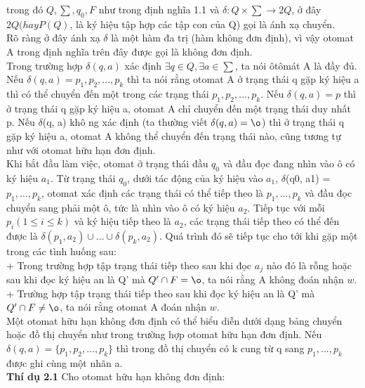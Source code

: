 \begin{flushleft}
trong đó $Q, \sum, q_0, F$ như trong định nghĩa 1.1 và $\delta: Q \times \sum \to 2Q$, ở đây $2Q (hay P(Q)$, là ký hiệu tập hợp các tập con của Q) gọi là ánh xạ chuyển.\\
Rõ ràng ở đây ánh xạ $\delta$ là một hàm đa trị (hàm không đơn định), vì vậy otomat A trong định nghĩa trên đây được gọi là không đơn định.\\
Trong trường hợp $\delta(q, a)$ xác định $\exists q \in Q, \exists a \in \sum$, ta nói ôtômát A là đầy đủ.\\
\hspace{10mm}Nếu $\delta(q, a) = {p_1, p_2,..., p_k}$ thì ta nói rằng otomat A ở trạng thái q gặp ký hiệu a thì có thể chuyển đến một trong các trạng thái $p_1, p_2,..., p_k$. Nếu $\delta(q, a) = {p}$ thì ở trạng thái q gặp ký hiệu a, otomat A chỉ chuyển đến một trạng thái duy nhất p. Nếu $\delta$(q, a) khô ng xác định (ta thường viết $\delta(q, a) = \o $) thì ở trạng thái q gặp ký hiệu a, otomat A không thể chuyển đến trạng thái nào, cũng tương tự như với otomat hữu hạn đơn định.\\
\hspace{10mm}Khi bắt đầu làm việc, otomat ở trạng thái đầu $q_0$ và đầu đọc đang nhìn vào ô có ký hiệu $a_1$. Từ trạng thái $q_0$, dưới tác động của ký hiệu vào $a_1$, $\delta$(q0, a1) = {$p_1,..., p_k$}, otomat xác định các trạng thái có thể tiếp theo là $p_1,..., p_k$ và đầu đọc chuyển sang phải một ô, tức là nhìn vào ô có ký hiệu $a_2$. Tiếp tục với mỗi $p_i (1 \le i \le k)$ và ký hiệu tiếp theo là $a_2$, các trạng thái tiếp theo có thể đến được là $\delta(p_1, a_2)\cup...\cup \delta(p_k, a_2)$. Quá trình đó sẽ tiếp tục cho tới khi gặp một trong các tình huống sau:\\
+ Trong trường hợp tập trạng thái tiếp theo sau khi đọc $a_j$ nào đó là rỗng hoặc sau khi đọc ký hiệu an là Q' mà $Q' \cap F = \o$, ta nói rằng A không đoán nhận $w$.\\
+ Trường hợp tập trạng thái tiếp theo sau khi đọc ký hiệu an là Q' mà $Q' \cap F \ne \o$, ta nói rằng otomat A đoán nhận $w$.\\
Một otomat hữu hạn không đơn định có thể biểu diễn dưới dạng bảng chuyển hoặc đồ thị chuyển như trong trường hợp otomat hữu hạn đơn định. Nếu $\delta(q, a) = \{p_1, p_2, ..., p_k\}$ thì trong đồ thị chuyển có k cung từ q sang $p_1, ..., p_k$ được ghi cùng một nhãn a. \\
\textbf{Thí dụ 2.1} Cho otomat hữu hạn không đơn định:\\

\end{flushleft}
